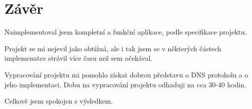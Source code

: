 \section{Závěr}

Naimplementoval jsem kompletní a funkční aplikace, podle specifikace projektu.

Projekt se mi nejevil jako obtížná, ale i tak jsem se v některých
částech implemenatce strávil více času než sem očekával.

Vypracování projektu mi pomohlo získat dobrou představu o DNS protokolu a
o jeho implementaci. Dobu na vypracování projektu odhaduji na cca 30-40 hodin.

Celkově jsem spokojen s výsledkem.
